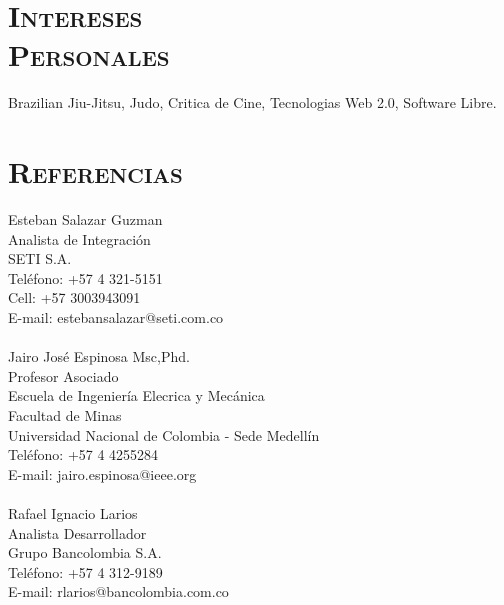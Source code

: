 \begin{resume}
\section{\textsc{Intereses\\ Personales}}
\employer{}
\title{}
\location{} 
\dates{}
Brazilian Jiu-Jitsu, Judo, Critica de Cine, Tecnologias Web 2.0, Software Libre.
\section{\textsc{Referencias}}

 Esteban Salazar Guzman\\
 Analista de Integraci\'{o}n  \\
 SETI S.A. \\
 Tel\'{e}fono: +57 4 321-5151 \\
 Cell: +57 3003943091 \\ 
 E-mail: estebansalazar@seti.com.co\\
 \\  
 Jairo Jos\'{e} Espinosa Msc,Phd.\\
 Profesor Asociado \\
 Escuela de Ingenier\'{i}a Elecrica y Mec\'{a}nica \\
 Facultad de Minas \\
 Universidad Nacional de Colombia - Sede  Medell\'{i}n\\
 Tel\'{e}fono: +57 4 4255284 \\
 E-mail: jairo.espinosa@ieee.org\\
 \\  
 Rafael Ignacio Larios\\
 Analista Desarrollador \\
 Grupo Bancolombia S.A. \\
 Tel\'{e}fono: +57 4 312-9189  \\
 E-mail: rlarios@bancolombia.com.co 


\end{resume}
